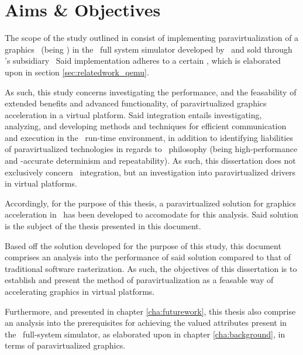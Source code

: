 
\chapter{Aims \& Objectives}
\label{cha:aimsandobjectives}
The scope of the study outlined in  consist of implementing paravirtualization of a graphics \dvttermapi\ (being \dvttermopenglestwopointo ) in the \dvttermsimics\ full system simulator developed by \dvttermintel\ and sold through \dvttermintel 's subsidiary \dvttermwindriver\ 
Said implementation adheres to a certain \dvttermreferenceimplementation , which is elaborated upon in section \ref{sec:relatedwork_qemu}.

As such, this study concerns investigating the performance, and the feasability of extended benefits and advanced functionality, of paravirtualized graphics acceleration in a virtual platform.
Said integration entails investigating, analyzing, and developing methods and techniques for efficient communication and execution in the \dvttermsimics\ run-time environment, in addition to identifying liabilities of paravirtualized technologies in regards to \dvttermsimics\ philosophy (being high-performance and \dvttermtiming -accurate determinism and repeatability).
As such, this dissertation does not exclusively concern \dvttermsimics\ integration, but an investigation into paravirtualized drivers in virtual platforms.

Accordingly, for the purpose of this thesis, a paravirtualized solution for graphics acceleration in \dvttermsimics\ has been developed to accomodate for this analysis.
Said solution is the subject of the thesis presented in this document.

Based off the solution developed for the purpose of this study, this document comprises an analysis into the performance of said solution compared to that of traditional software rasterization.
As such, the objectives of this dissertation is to establish and present the method of paravirtualization as a feasable way of accelerating graphics in virtual platforms.

Furthermore, and presented in chapter \ref{cha:futurework}, this thesis also comprise an analysis into the prerequisites for achieving the valued attributes present in the \dvttermsimics\ full-system simulator, as elaborated upon in chapter \ref{cha:background}, in terms of paravirtualized graphics.
